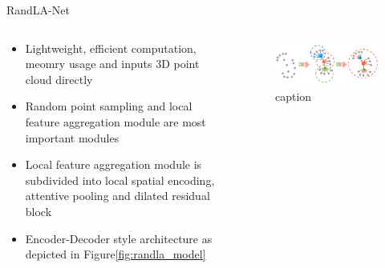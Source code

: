 \documentclass[aspectratio=169]{beamer}
\begin{document}
\begin{frame}{RandLA-Net}
    \begin{columns}
        \begin{column}{0.6\textwidth}
            \begin{itemize}
                \item Lightweight, efficient computation, meomry usage and inputs 3D point cloud directly
                \item Random point sampling and local feature aggregation module are most important modules
                \item Local feature aggregation module is subdivided into local spatial encoding, attentive pooling and dilated residual block
                \item Encoder-Decoder style architecture as depicted in Figure\ref{fig:randla_model}
            \end{itemize}
        \end{column}
        \begin{column}{0.4\textwidth}
            \begin{figure}
                \centering
                \includegraphics[scale=0.35]{images/randlanet_dires_effect.jpg}
                \caption{caption}
                \label{fig:dires_effect}
            \end{figure}
        \end{column}
    \end{columns}
    
\end{frame}
\end{document}
